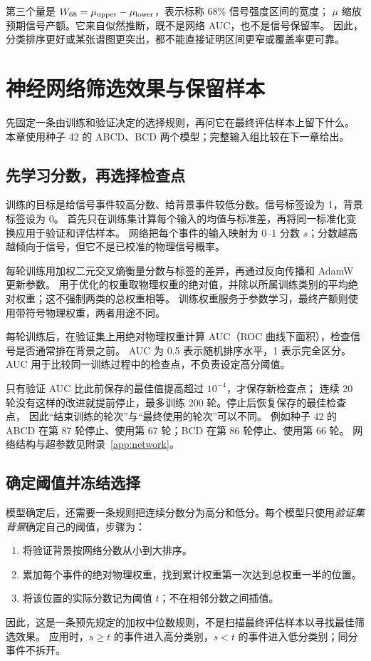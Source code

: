\documentclass[11pt,a4paper,fontset=fandol,scheme=plain]{ctexart}
\begin{document}
第三个量是 $W_{68}=\mu_{\rm upper}-\mu_{\rm lower}$，表示标称 68\% 信号强度区间的宽度；
$\mu$ 缩放预期信号产额。它来自似然推断，既不是网络 AUC，也不是信号保留率。
因此，分类排序更好或某张谱图更突出，都不能直接证明区间更窄或覆盖率更可靠。

\FloatBarrier

\section{神经网络筛选效果与保留样本}

先固定一条由训练和验证决定的选择规则，再问它在最终评估样本上留下什么。
本章使用种子 42 的 ABCD、BCD 两个模型；完整输入组比较在下一章给出。

\subsection{先学习分数，再选择检查点}

训练的目标是给信号事件较高分数、给背景事件较低分数。信号标签设为 1，背景标签设为 0。
首先只在训练集计算每个输入的均值与标准差，再将同一标准化变换应用于验证和评估样本。
网络把每个事件的输入映射为 $0$--$1$ 分数 $s$；分数越高越倾向于信号，但它不是已校准的物理信号概率。

每轮训练用加权二元交叉熵衡量分数与标签的差异，再通过反向传播和 AdamW 更新参数。
用于优化的权重取物理权重的绝对值，并除以所属训练类别的平均绝对权重；这不强制两类的总权重相等。
训练权重服务于参数学习，最终产额则使用带符号物理权重，两者用途不同。

每轮训练后，在验证集上用绝对物理权重计算 AUC（ROC 曲线下面积），检查信号是否通常排在背景之前。
AUC 为 0.5 表示随机排序水平，1 表示完全区分。AUC 用于比较同一训练过程中的检查点，不负责设定高分阈值。

只有验证 AUC 比此前保存的最佳值提高超过 $10^{-4}$，才保存新检查点；
连续 20 轮没有这样的改进就提前停止，最多训练 200 轮。停止后恢复保存的最佳检查点，
因此“结束训练的轮次”与“最终使用的轮次”可以不同。
例如种子 42 的 ABCD 在第 87 轮停止、使用第 67 轮；BCD 在第 86 轮停止、使用第 66 轮。
网络结构与超参数见附录~\ref{app:network}。

\subsection{确定阈值并冻结选择}

模型确定后，还需要一条规则把连续分数分为高分和低分。每个模型只使用\emph{验证集背景}确定自己的阈值，步骤为：
\begin{enumerate}[leftmargin=1.7em,itemsep=2pt,topsep=3pt]
\item 将验证背景按网络分数从小到大排序。
\item 累加每个事件的绝对物理权重，找到累计权重第一次达到总权重一半的位置。
\item 将该位置的实际分数记为阈值 $t$；不在相邻分数之间插值。
\end{enumerate}
因此，这是一条预先规定的加权中位数规则，不是扫描最终评估样本以寻找最佳筛选效果。
应用时，$s\geq t$ 的事件进入高分类别，$s<t$ 的事件进入低分类别；同分事件不拆开。
\end{document}
